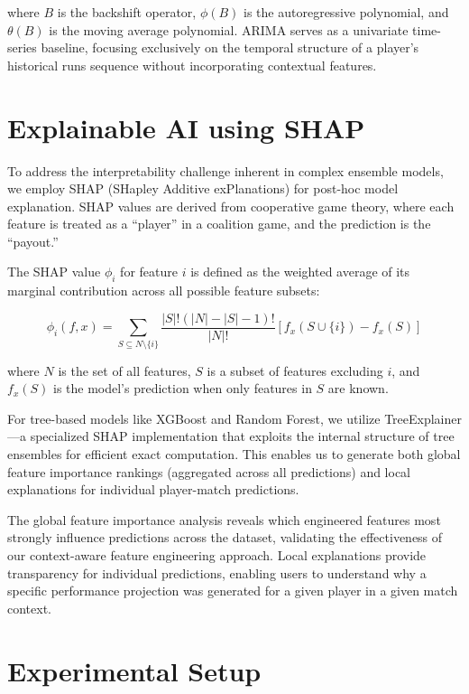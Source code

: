 \documentclass[conference]{IEEEtran}
\begin{document}
where \(B\) is the backshift operator, \(\phi(B)\) is the autoregressive polynomial, and \(\theta(B)\) is the moving average polynomial. ARIMA serves as a univariate time-series baseline, focusing exclusively on the temporal structure of a player's historical runs sequence without incorporating contextual features.

\section{Explainable AI using SHAP}
To address the interpretability challenge inherent in complex ensemble models, we employ SHAP (SHapley Additive exPlanations) for post-hoc model explanation. SHAP values are derived from cooperative game theory, where each feature is treated as a ``player'' in a coalition game, and the prediction is the ``payout.''

The SHAP value \(\phi_i\) for feature \(i\) is defined as the weighted average of its marginal contribution across all possible feature subsets:

\begin{equation}
\phi_i(f, x) = \sum_{S \subseteq N \setminus \{i\}} \frac{|S|!(|N|-|S|-1)!}{|N|!} [f_x(S \cup \{i\}) - f_x(S)]
\label{eq:shap}
\end{equation}

where \(N\) is the set of all features, \(S\) is a subset of features excluding \(i\), and \(f_x(S)\) is the model's prediction when only features in \(S\) are known.

For tree-based models like XGBoost and Random Forest, we utilize TreeExplainer—a specialized SHAP implementation that exploits the internal structure of tree ensembles for efficient exact computation. This enables us to generate both global feature importance rankings (aggregated across all predictions) and local explanations for individual player-match predictions.

The global feature importance analysis reveals which engineered features most strongly influence predictions across the dataset, validating the effectiveness of our context-aware feature engineering approach. Local explanations provide transparency for individual predictions, enabling users to understand why a specific performance projection was generated for a given player in a given match context.

\section{Experimental Setup}
\end{document}
